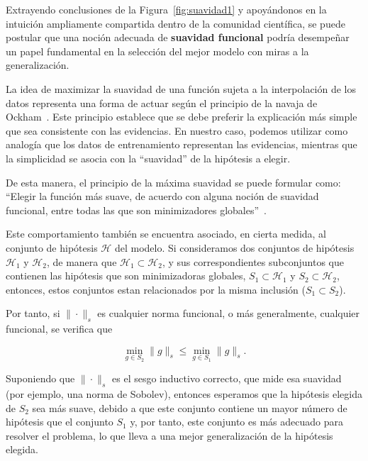 Extrayendo conclusiones de la Figura~\ref{fig:suavidad1} y apoyándonos en la intuición ampliamente compartida dentro de la comunidad científica, se puede postular que una noción adecuada de \textbf{suavidad funcional} podría desempeñar un papel fundamental en la selección del mejor modelo con miras a la generalización.\newline  

La idea de maximizar la suavidad de una función sujeta a la interpolación de los datos representa una forma de actuar según el principio de la navaja de Ockham~\cite{Blumer1987}. Este principio establece que se debe preferir la explicación más simple que sea consistente con las evidencias. En nuestro caso, podemos utilizar como analogía que los datos de entrenamiento representan las evidencias, mientras que la simplicidad se asocia con la ``suavidad'' de la hipótesis a elegir.\newline

De esta manera, el principio de la máxima suavidad se puede formular como: ``Elegir la función más suave, de acuerdo con alguna noción de suavidad funcional, entre todas las que son minimizadores globales''~\cite{Belkin2021}.\newline

Este comportamiento también se encuentra asociado, en cierta medida, al conjunto de hipótesis $\mathcal{H}$ del modelo. Si consideramos dos conjuntos de hipótesis $\mathcal{H}_1$ y $\mathcal{H}_2$, de manera que $\mathcal{H}_1 \subset \mathcal{H}_2$, y sus correspondientes subconjuntos que contienen las hipótesis que son minimizadoras globales, $S_1 \subset \mathcal{H}_1$ y $S_2 \subset \mathcal{H}_2$, entonces, estos conjuntos estan relacionados por la misma inclusión ($S_1 \subset S_2$).\newline

Por tanto, si $\| \cdot \|_{s}$ es cualquier norma funcional, o más generalmente, cualquier funcional, se verifica que

\[
    \min_{g \in S_2} \| g \|_{s} \leq \min_{g \in S_1} \| g \|_{s}.
\]

Suponiendo que $\| \cdot \|_{s}$ es el sesgo inductivo correcto, que mide esa suavidad (por ejemplo, una norma de Sobolev), entonces esperamos que la hipótesis elegida de $S_2$ sea más suave, debido a que este conjunto contiene un mayor número de hipótesis que el conjunto $S_1$ y, por tanto, este conjunto es más adecuado para resolver el problema, lo que lleva a una mejor generalización de la hipótesis elegida.\newline

